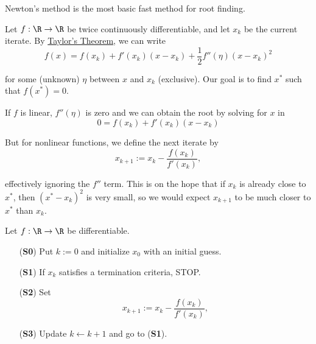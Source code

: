 \label{bfda7fb}

Newton's method is the most basic fast method for root finding.

Let $f:\R\to\R$ be twice continuously differentiable, and let $x_k$ be the
current iterate. By \href{c980e4c}{Taylor's Theorem}, we can write
$$
  f(x)=f(x_k)+f'(x_k)(x-x_k)+\frac12f''(\eta)(x-x_k)^2
$$

for some (unknown) $\eta$ between $x$ and $x_k$ (exclusive). Our goal is to
find $x^*$ such that $f(x^*)=0$.

If $f$ is linear, $f''(\eta)$ is zero and we can obtain the root by solving for
$x$ in
$$
  0=f(x_k)+f'(x_k)(x-x_k)
$$

But for nonlinear functions, we define the next iterate by
$$
  x_{k+1}:=x_k-\frac{f(x_k)}{f'(x_k)},
$$

effectively ignoring the $f''$ term. This is on the hope that if $x_k$ is
already close to $x^*$, then $(x^*-x_k)^2$ is very small, so we would expect
$x_{k+1}$ to be much closer to $x^*$ than $x_k$.

\label{d1bf583}

Let $f:\R\to\R$ be differentiable.
\begin{itemize}
  \item[(\textbf{S0})] Put $k:=0$ and initialize $x_0$ with an initial guess.
  \item[(\textbf{S1})] If $x_k$ satisfies a termination criteria, STOP.
  \item[(\textbf{S2})] Set
        $$
          x_{k+1}:=x_k-\frac{f(x_k)}{f'(x_k)},
        $$
  \item[(\textbf{S3})] Update $k\gets k+1$ and go to (\textbf{S1}).
\end{itemize}

\label{e5c0766}

%


